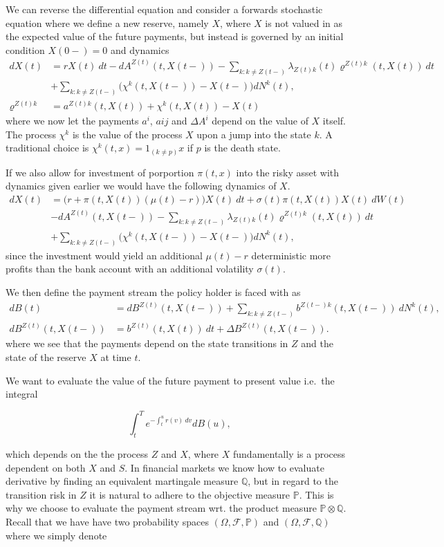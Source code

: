 \documentclass[a4paper,10pt,openany]{book}
\begin{document}
We can reverse the differential equation and consider a forwards stochastic equation where we define a new reserve, namely \(X\), where \(X\) is not valued in as the expected value of the future payments, but instead is governed by an initial condition \(X(0-)=0\) and dynamics
\begin{align*}
dX(t)&=rX(t)\ dt-dA^{Z(t)}(t,X(t-))-\sum_{k:k\ne Z(t-)}\lambda_{Z(t)k}(t) \varrho^{Z(t)k}(t,X(t))\ dt\\
&+\sum_{k:k\ne Z(t-)}\Big(\chi^k(t,X(t-))-X(t-)\Big)dN^k(t),\\
\varrho^{Z(t)k}&=a^{Z(t)k}(t,X(t))+\chi^k(t,X(t))-X(t)
\end{align*}
where we now let the payments \(a^i\), \(a{ij}\) and \(\Delta A^i\) depend on the value of \(X\) itself. The process \(\chi^k\) is the value of the process \(X\) upon a jump into the state \(k\). A traditional choice is \(\chi^k(t,x)=1_{(k\ne p)}x\) if \(p\) is the death state.

If we also allow for investment of porportion \(\pi(t,x)\) into the risky asset with dynamics given earlier we would have the following dynamics of \(X\).
\begin{align*}
dX(t)&=\Big(r+\pi(t,X(t))(\mu(t)-r)\Big)X(t)\ dt+\sigma(t)\pi(t,X(t))X(t)\ dW(t)\\
&-dA^{Z(t)}(t,X(t-))-\sum_{k:k\ne Z(t-)}\lambda_{Z(t)k}(t) \varrho^{Z(t)k}(t,X(t))\ dt\\
&+\sum_{k:k\ne Z(t-)}\Big(\chi^k(t,X(t-))-X(t-)\Big)dN^k(t),
\end{align*}
since the investment would yield an additional \(\mu(t)-r\) deterministic more profits than the bank account with an additional volatility \(\sigma(t)\).

We then define the payment stream the policy holder is faced with as
\begin{align*}
dB(t)&=dB^{Z(t)}(t,X(t-))+\sum_{k:k\ne Z(t-)}b^{Z(t-)k}(t,X(t-))\ dN^k(t),\\
dB^{Z(t)}(t,X(t-))&=b^{Z(t)}(t,X(t))\ dt + \Delta B^{Z(t)}(t,X(t-)).
\end{align*}
where we see that the payments depend on the state transitions in \(Z\) and the state of the reserve \(X\) at time \(t\).

We want to evaluate the value of the future payment to present value i.e.~the integral

\[
\int_t^Te^{-\int_t^u r(v)\ dv}dB(u),
\]

which depends on the the process \(Z\) and \(X\), where \(X\) fundamentally is a process dependent on both \(X\) and \(S\). In financial markets we know how to evaluate derivative by finding an equivalent martingale measure \(\mathbb Q\), but in regard to the transition risk in \(Z\) it is natural to adhere to the objective measure \(\mathbb P\). This is why we choose to evaluate the payment stream wrt. the product measure \(\mathbb P\otimes \mathbb Q\). Recall that we have have two probability spaces \((\Omega, \mathcal F,\mathbb P)\) and \((\Omega, \mathcal F,\mathbb Q)\) where we simply denote
\end{document}
